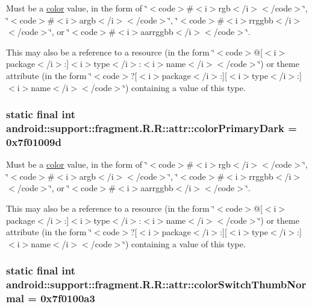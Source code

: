 Must be a \hyperlink{classandroid_1_1support_1_1fragment_1_1_r_1_1color}{color} value, in the form of \char`\"{}$<$code$>$\#$<$i$>$rgb$<$/i$>$$<$/code$>$\char`\"{}, \char`\"{}$<$code$>$\#$<$i$>$argb$<$/i$>$$<$/code$>$\char`\"{}, \char`\"{}$<$code$>$\#$<$i$>$rrggbb$<$/i$>$$<$/code$>$\char`\"{}, or \char`\"{}$<$code$>$\#$<$i$>$aarrggbb$<$/i$>$$<$/code$>$\char`\"{}. 

This may also be a reference to a resource (in the form \char`\"{}$<$code$>$@\mbox{[}$<$i$>$package$<$/i$>$:\mbox{]}$<$i$>$type$<$/i$>$:$<$i$>$name$<$/i$>$$<$/code$>$\char`\"{}) or theme attribute (in the form \char`\"{}$<$code$>$?\mbox{[}$<$i$>$package$<$/i$>$:\mbox{]}\mbox{[}$<$i$>$type$<$/i$>$:\mbox{]}$<$i$>$name$<$/i$>$$<$/code$>$\char`\"{}) containing a value of this type. \hypertarget{classandroid_1_1support_1_1fragment_1_1_r_1_1attr_ac1aa56208cf7b6acc97eac5c0bed8a4}{
\subsubsection[{colorPrimaryDark}]{\setlength{\rightskip}{0pt plus 5cm}static final int android::support::fragment.R.R::attr::colorPrimaryDark = 0x7f01009d}}
\label{classandroid_1_1support_1_1fragment_1_1_r_1_1attr_ac1aa56208cf7b6acc97eac5c0bed8a4}


Must be a \hyperlink{classandroid_1_1support_1_1fragment_1_1_r_1_1color}{color} value, in the form of \char`\"{}$<$code$>$\#$<$i$>$rgb$<$/i$>$$<$/code$>$\char`\"{}, \char`\"{}$<$code$>$\#$<$i$>$argb$<$/i$>$$<$/code$>$\char`\"{}, \char`\"{}$<$code$>$\#$<$i$>$rrggbb$<$/i$>$$<$/code$>$\char`\"{}, or \char`\"{}$<$code$>$\#$<$i$>$aarrggbb$<$/i$>$$<$/code$>$\char`\"{}. 

This may also be a reference to a resource (in the form \char`\"{}$<$code$>$@\mbox{[}$<$i$>$package$<$/i$>$:\mbox{]}$<$i$>$type$<$/i$>$:$<$i$>$name$<$/i$>$$<$/code$>$\char`\"{}) or theme attribute (in the form \char`\"{}$<$code$>$?\mbox{[}$<$i$>$package$<$/i$>$:\mbox{]}\mbox{[}$<$i$>$type$<$/i$>$:\mbox{]}$<$i$>$name$<$/i$>$$<$/code$>$\char`\"{}) containing a value of this type. \hypertarget{classandroid_1_1support_1_1fragment_1_1_r_1_1attr_90586bf33ac1949ce00aa93b17914a9e}{
\subsubsection[{colorSwitchThumbNormal}]{\setlength{\rightskip}{0pt plus 5cm}static final int android::support::fragment.R.R::attr::colorSwitchThumbNormal = 0x7f0100a3}}
\label{classandroid_1_1support_1_1fragment_1_1_r_1_1attr_90586bf33ac1949ce00aa93b17914a9e}



